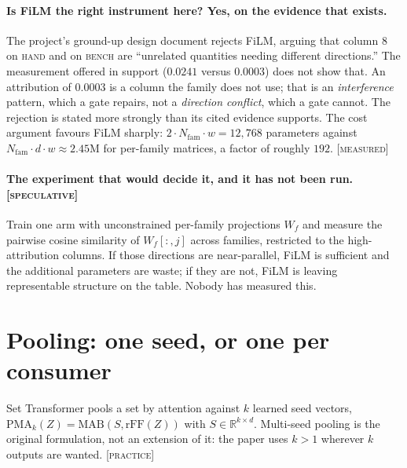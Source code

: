 \documentclass[11pt,a4paper]{article}
\newcommand{\tagM}{\textcolor{cV2}{\textsc{[measured]}}}
\newcommand{\tagP}{\textsc{[practice]}}
\newcommand{\tagS}{\textcolor{cBad}{\textsc{[speculative]}}}
\begin{document}
\paragraph{Is FiLM the right instrument here? Yes, on the evidence that exists.}
The project's ground-up design document rejects FiLM, arguing that column 8 on
\textsc{hand} and on \textsc{bench} are ``unrelated quantities needing different
directions.'' The measurement offered in support ($0.0241$ versus $0.0003$) does
not show that. An attribution of $0.0003$ is a column the family does not use;
that is an \emph{interference} pattern, which a gate repairs, not a
\emph{direction conflict}, which a gate cannot. The rejection is stated more
strongly than its cited evidence supports. The cost argument favours FiLM
sharply: $2 \cdot N_{\text{fam}} \cdot w = 12{,}768$ parameters against
$N_{\text{fam}} \cdot d \cdot w \approx 2.45$M for per-family matrices, a factor
of roughly $192$. \tagM

\paragraph{The experiment that would decide it, and it has not been run. \tagS}
\label{sec:filmtest}
Train one arm with unconstrained per-family projections $W_f$ and measure the
pairwise cosine similarity of $W_f[:,j]$ across families, restricted to the
high-attribution columns. If those directions are near-parallel, FiLM is
sufficient and the additional parameters are waste; if they are not, FiLM is
leaving representable structure on the table. Nobody has measured this.

\section{Pooling: one seed, or one per consumer}

Set Transformer \cite{lee2019set} pools a set by attention against $k$ learned
seed vectors, $\mathrm{PMA}_k(Z) = \mathrm{MAB}(S, \mathrm{rFF}(Z))$ with
$S \in \mathbb{R}^{k \times d}$. Multi-seed pooling is the original formulation,
not an extension of it: the paper uses $k > 1$ wherever $k$ outputs are wanted.
\tagP
\end{document}
